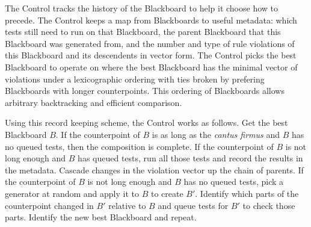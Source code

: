 The Control tracks the history of the Blackboard to help it choose how to precede.
The Control keeps a map from Blackboards to useful metadata: 
  which tests still need to run on that Blackboard,
  the parent Blackboard that this Blackboard was generated from,
  and the number and type of rule violations of this Blackboard and its descendents in vector form.
The Control picks the best Blackboard to operate on 
  where the best Blackboard has the minimal vector of violations under a lexicographic ordering 
  with ties broken by prefering Blackboards with longer counterpoints.
This ordering of Blackboards allows arbitrary backtracking and efficient comparison.

Using this record keeping scheme, the Control works as follows.
Get the best Blackboard $B$.
If the counterpoint of $B$ is as long as the \emph{cantus firmus} and $B$ has no queued tests, then the composition is complete.
If the counterpoint of $B$ is not long enough and $B$ has queued tests, run all those tests and record the results in the metadata. 
  Cascade changes in the violation vector up the chain of parents.
If the counterpoint of $B$ is not long enough and $B$ has no queued tests, pick a generator at random and apply it to $B$ to create $B'$.
  Identify which parts of the counterpoint changed in $B'$ relative to $B$ and queue tests for $B'$ to check those parts.
Identify the new best Blackboard and repeat.
